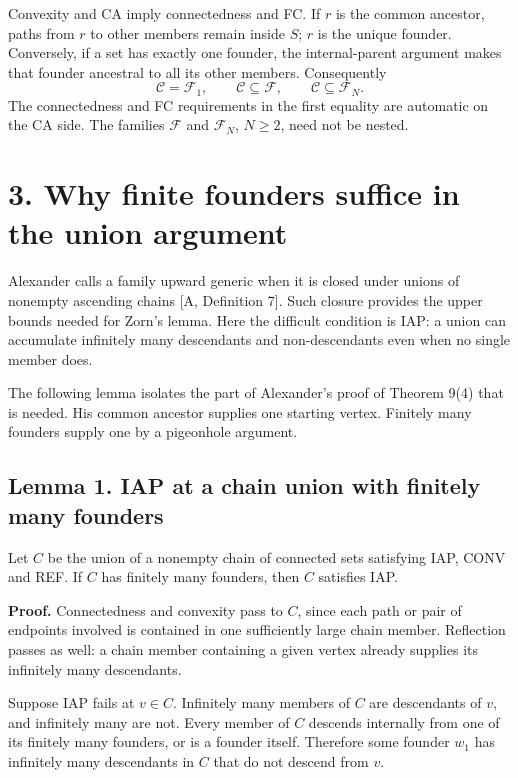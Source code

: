 \documentclass[
  11pt,
  letterpaper,
]{article}
\begin{document}
Convexity and CA imply connectedness and FC. If \(r\) is the common
ancestor, paths from \(r\) to other members remain inside \(S\); \(r\)
is the unique founder. Conversely, if a set has exactly one founder, the
internal-parent argument makes that founder ancestral to all its other
members. Consequently \[
                    \mathcal C=\mathcal F_1,
 \qquad \mathcal C\subseteq\mathcal F,\qquad
                    \mathcal C\subseteq\mathcal F_N.
\] The connectedness and FC requirements in the first equality are
automatic on the CA side. The families \(\mathcal F\) and
\(\mathcal F_N\), \(N\geq2\), need not be nested.

\section{3. Why finite founders suffice in the union
argument}\label{why-finite-founders-suffice-in-the-union-argument}

Alexander calls a family upward generic when it is closed under unions
of nonempty ascending chains {[}A, Definition 7{]}. Such closure
provides the upper bounds needed for Zorn's lemma. Here the difficult
condition is IAP: a union can accumulate infinitely many descendants and
non-descendants even when no single member does.

The following lemma isolates the part of Alexander's proof of Theorem
9(4) that is needed. His common ancestor supplies one starting vertex.
Finitely many founders supply one by a pigeonhole argument.

\subsection{Lemma 1. IAP at a chain union with finitely many
founders}\label{lemma-1.-iap-at-a-chain-union-with-finitely-many-founders}

Let \(C\) be the union of a nonempty chain of connected sets satisfying
IAP, CONV and REF. If \(C\) has finitely many founders, then \(C\)
satisfies IAP.

\textbf{Proof.} Connectedness and convexity pass to \(C\), since each
path or pair of endpoints involved is contained in one sufficiently
large chain member. Reflection passes as well: a chain member containing
a given vertex already supplies its infinitely many descendants.

Suppose IAP fails at \(v\in C\). Infinitely many members of \(C\) are
descendants of \(v\), and infinitely many are not. Every member of \(C\)
descends internally from one of its finitely many founders, or is a
founder itself. Therefore some founder \(w_1\) has infinitely many
descendants in \(C\) that do not descend from \(v\).
\end{document}
